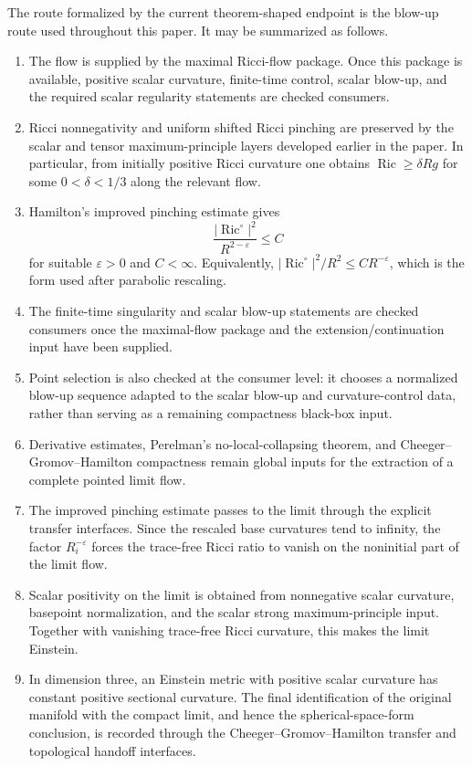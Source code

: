 \documentclass[11pt]{article}
\theoremstyle{plain}
\theoremstyle{definition}
\theoremstyle{remark}
\newcommand{\Ric}{\operatorname{Ric}}
\newcommand{\norm}[1]{\left|#1\right|}
\newcommand{\eps}{\varepsilon}
\begin{document}
The route formalized by the current theorem-shaped endpoint is the blow-up route
used throughout this paper.  It may be summarized as follows.
\begin{enumerate}[leftmargin=2em]
  \item The flow is supplied by the maximal Ricci-flow package.  Once this
  package is available, positive scalar curvature, finite-time control, scalar
  blow-up, and the required scalar regularity statements are checked consumers.
  \item Ricci nonnegativity and uniform shifted Ricci pinching are preserved by
  the scalar and tensor maximum-principle layers developed earlier in the paper.
  In particular, from initially positive Ricci curvature one obtains
  \(\Ric \ge \delta Rg\) for some \(0<\delta<1/3\) along the relevant flow.
  \item Hamilton's improved pinching estimate gives
  \[
    \frac{\norm{\Ric^\circ}^2}{R^{2-\eps}}\le C
  \]
  for suitable \(\eps>0\) and \(C<\infty\).  Equivalently,
  \(\norm{\Ric^\circ}^2/R^2\le C R^{-\eps}\), which is the form used after
  parabolic rescaling.
  \item The finite-time singularity and scalar blow-up statements are checked
  consumers once the maximal-flow package and the extension/continuation input
  have been supplied.
  \item Point selection is also checked at the consumer level: it chooses a
  normalized blow-up sequence adapted to the scalar blow-up and curvature-control
  data, rather than serving as a remaining compactness black-box input.
  \item Derivative estimates, Perelman's no-local-collapsing theorem, and
  Cheeger--Gromov--Hamilton compactness remain global inputs for the extraction
  of a complete pointed limit flow.
  \item The improved pinching estimate passes to the limit through the explicit
  transfer interfaces.  Since the rescaled base curvatures tend to infinity, the
  factor \(R_i^{-\eps}\) forces the trace-free Ricci ratio to vanish on the
  noninitial part of the limit flow.
  \item Scalar positivity on the limit is obtained from nonnegative scalar
  curvature, basepoint normalization, and the scalar strong maximum-principle
  input.  Together with vanishing trace-free Ricci curvature, this makes the
  limit Einstein.
  \item In dimension three, an Einstein metric with positive scalar curvature
  has constant positive sectional curvature.  The final identification of the
  original manifold with the compact limit, and hence the spherical-space-form
  conclusion, is recorded through the Cheeger--Gromov--Hamilton transfer and
  topological handoff interfaces.
\end{enumerate}
\end{document}
